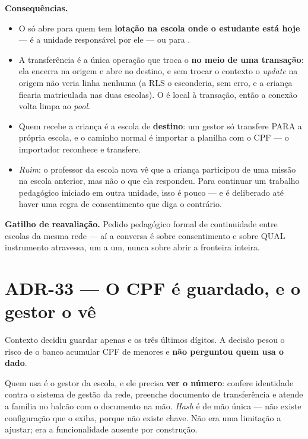 \textbf{Consequências.}
\begin{itemize}
  \item O  só abre para quem tem \textbf{lotação na escola onde o
    estudante está hoje} --- é a unidade responsável por ele --- ou para
    .
  \item A transferência é a única operação que troca o 
    \textbf{no meio de uma transação}: ela encerra na origem e abre no destino, e
    sem trocar o contexto o \emph{update} na origem não veria linha nenhuma (a RLS
    o esconderia, sem erro, e a criança ficaria matriculada nas duas escolas). O
     é local à transação, então a conexão volta limpa
    ao \emph{pool}.
  \item Quem recebe a criança é a escola de \textbf{destino}: um gestor só
    transfere PARA a própria escola, e o caminho normal é importar a planilha com
    o CPF --- o importador reconhece e transfere.
  \item \emph{Ruim}: o professor da escola nova vê que a criança participou de
    uma missão na escola anterior, mas não o que ela respondeu. Para continuar um
    trabalho pedagógico iniciado em outra unidade, isso é pouco --- e é
    deliberado até haver uma regra de consentimento que diga o contrário.
\end{itemize}

\textbf{Gatilho de reavaliação.} Pedido pedagógico formal de continuidade entre
escolas da mesma rede --- aí a conversa é sobre consentimento e sobre QUAL
instrumento atravessa, um a um, nunca sobre abrir a fronteira inteira.

\section{ADR-33 --- O CPF é guardado, e o gestor o vê}
\label{adr:cpf-em-claro}

\begin{especificacao}{Contexto}
 decidiu guardar apenas  e os três
últimos dígitos. A decisão pesou o risco de o banco acumular CPF de menores e
\textbf{não perguntou quem usa o dado}.

Quem usa é o gestor da escola, e ele precisa \textbf{ver o número}: confere
identidade contra o sistema de gestão da rede, preenche documento de
transferência e atende a família no balcão com o documento na mão. \emph{Hash} é
de mão única --- não existe configuração que o exiba, porque não existe chave.
Não era uma limitação a ajustar; era a funcionalidade ausente por construção.
\end{especificacao}

